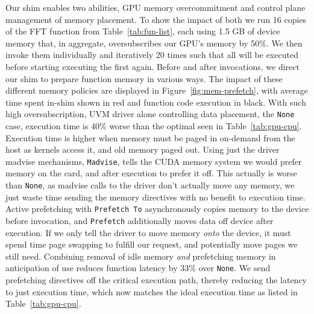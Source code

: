 Our shim enables two abilities, GPU memory overcommitment and control plane management of memory placement.
To show the impact of both we run 16 copies of the FFT function from Table~\ref{tab:fun-list}, each using 1.5 GB of device memory that, in aggregate, oversubscribes our GPU's memory by 50\%.
We then invoke them individually and iteratively 20 times such that all will be executed before starting executing the first again.
Before and after invocations, we direct our shim to prepare function memory in various ways.
The impact of these different memory policies are displayed in Figure~\ref{fig:mem-prefetch}, with average time spent in-shim shown in red and function code execution in black.
With such high oversubscription, UVM driver alone controlling data placement, the \texttt{None} case, execution time is 40\% worse than the optimal seen in Table~\ref{tab:gpu-cpu}.
Execution time is higher when memory must be paged in on-demand from the host as kernels access it, and old memory paged out.
Using just the driver madvise mechanisms, \texttt{Madvise}, tells the CUDA memory system we would prefer memory on the card, and after execution to prefer it off.
This actually is worse than \texttt{None}, as madvise calls to the driver don't actually move any memory, we just waste time sending the memory directives with no benefit to execution time.
Active prefetching with \texttt{Prefetch To} asynchronously copies memory to the device before invocation, and \texttt{Prefetch} additionally moves data off device after execution.
If we only tell the driver to move memory \textit{onto} the device, it must spend time page swapping to fulfill our request, and potentially move pages we still need.
Combining removal of idle memory \emph{and} prefetching memory in anticipation of use reduces function latency by 33\% over \texttt{None}.
We send prefetching directives off the critical execution path, thereby reducing the latency to just execution time, which now matches the ideal execution time as listed in Table~\ref{tab:gpu-cpu}.

